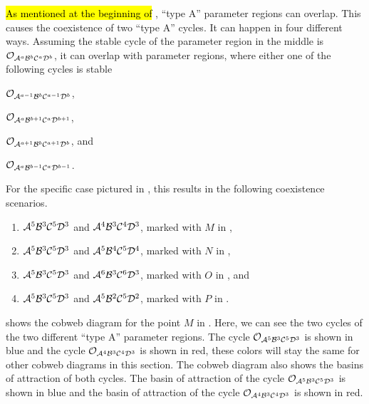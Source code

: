 \hl{As mentioned at the beginning of} , ``type A'' parameter regions can overlap.
This causes the coexistence of two ``type A'' cycles.
It can happen in four different ways.
Assuming the stable cycle of the parameter region in the middle is $\mathcal{O}_{\mathcal{A}^a\mathcal{B}^b\mathcal{C}^a\mathcal{D}^b}$, it can overlap with parameter regions, where either one of the following cycles is stable
\begin{enumerate*}
	\item $\mathcal{O}_{\mathcal{A}^{a-1}\mathcal{B}^b\mathcal{C}^{a-1}\mathcal{D}^b}$,
	\item $\mathcal{O}_{\mathcal{A}^a\mathcal{B}^{b+1}\mathcal{C}^a\mathcal{D}^{b+1}}$,
	\item $\mathcal{O}_{\mathcal{A}^{a+1}\mathcal{B}^b\mathcal{C}^{a+1}\mathcal{D}^b}$, and
	\item $\mathcal{O}_{\mathcal{A}^a\mathcal{B}^{b-1}\mathcal{C}^a\mathcal{D}^{b-1}}$.
\end{enumerate*}
For the specific case pictured in , this results in the following coexistence scenarios.
\begin{enumerate}
	\item $\mathcal{A}^5\mathcal{B}^3\mathcal{C}^5\mathcal{D}^3$ and $\mathcal{A}^4\mathcal{B}^3\mathcal{C}^4\mathcal{D}^3$, marked with $M$ in ,
	\item $\mathcal{A}^5\mathcal{B}^3\mathcal{C}^5\mathcal{D}^3$ and $\mathcal{A}^5\mathcal{B}^4\mathcal{C}^5\mathcal{D}^4$, marked with $N$ in ,
	\item $\mathcal{A}^5\mathcal{B}^3\mathcal{C}^5\mathcal{D}^3$ and $\mathcal{A}^6\mathcal{B}^3\mathcal{C}^6\mathcal{D}^3$, marked with $O$ in , and
	\item $\mathcal{A}^5\mathcal{B}^3\mathcal{C}^5\mathcal{D}^3$ and $\mathcal{A}^5\mathcal{B}^2\mathcal{C}^5\mathcal{D}^2$, marked with $P$ in .
\end{enumerate}
 shows the cobweb diagram for the point $M$ in .
Here, we can see the two cycles of the two different ``type A'' parameter regions.
The cycle $\mathcal{O}_{\mathcal{A}^5\mathcal{B}^3\mathcal{C}^5\mathcal{D}^3}$ is shown in blue and the cycle $\mathcal{O}_{\mathcal{A}^4\mathcal{B}^3\mathcal{C}^4\mathcal{D}^3}$ is shown in red, these colors will stay the same for other cobweb diagrams in this section.
The cobweb diagram also shows the basins of attraction of both cycles.
The basin of attraction of the cycle $\mathcal{O}_{\mathcal{A}^5\mathcal{B}^3\mathcal{C}^5\mathcal{D}^3}$ is shown in blue and the basin of attraction of the cycle $\mathcal{O}_{\mathcal{A}^4\mathcal{B}^3\mathcal{C}^4\mathcal{D}^3}$ is shown in red.

